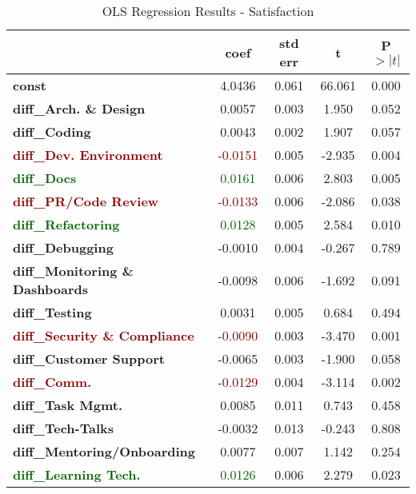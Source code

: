 \begin{table}
\centering
\caption{OLS Regression Results - Satisfaction}
\begin{tabular}{lcccc}
    \toprule
        & \textbf{coef} & \textbf{std err} & \textbf{t} & \textbf{P}\( > |t| \) \\
        \midrule
        \textbf{const} & 4.0436 & 0.061 & 66.061 & 0.000 \\
        \textbf{diff\_Arch. \& Design} & 0.0057 & 0.003 & 1.950 & 0.052 \\
        \textbf{diff\_Coding} & 0.0043 & 0.002 & 1.907 & 0.057 \\
        \textcolor{darkred}{\textbf{diff\_Dev. Environment}} & \textcolor{darkred}{-0.0151} & 0.005 & -2.935 & 0.004 \\
        \textcolor{darkgreen}{\textbf{diff\_Docs}} & \textcolor{darkgreen}{0.0161} & 0.006 & 2.803 & 0.005 \\
        \textcolor{darkred}{\textbf{diff\_PR/Code Review}} & \textcolor{darkred}{-0.0133} & 0.006 & -2.086 & 0.038 \\
        \textcolor{darkgreen}{\textbf{diff\_Refactoring}} & \textcolor{darkgreen}{0.0128} & 0.005 & 2.584 & 0.010 \\
        \textbf{diff\_Debugging} & -0.0010 & 0.004 & -0.267 & 0.789 \\
        \textbf{diff\_Monitoring \& Dashboards} & -0.0098 & 0.006 & -1.692 & 0.091 \\
        \textbf{diff\_Testing} & 0.0031 & 0.005 & 0.684 & 0.494 \\
        \textcolor{darkred}{\textbf{diff\_Security \& Compliance}} & \textcolor{darkred}{-0.0090} & 0.003 & -3.470 & 0.001 \\
        \textbf{diff\_Customer Support} & -0.0065 & 0.003 & -1.900 & 0.058 \\
        \textcolor{darkred}{\textbf{diff\_Comm.}} & \textcolor{darkred}{-0.0129} & 0.004 & -3.114 & 0.002 \\
        \textbf{diff\_Task Mgmt.} & 0.0085 & 0.011 & 0.743 & 0.458 \\
        \textbf{diff\_Tech-Talks} & -0.0032 & 0.013 & -0.243 & 0.808 \\
        \textbf{diff\_Mentoring/Onboarding} & 0.0077 & 0.007 & 1.142 & 0.254 \\
        \textcolor{darkgreen}{\textbf{diff\_Learning Tech.}} & \textcolor{darkgreen}{0.0126} & 0.006 & 2.279 & 0.023 \\
        \bottomrule
    \end{tabular}
    \label{tab:regression_results_satisfaction}
\end{table}